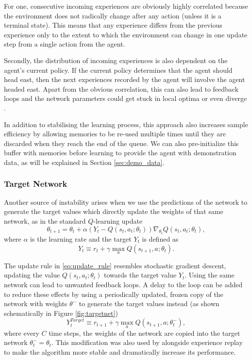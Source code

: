 For one, consecutive incoming experiences are obviously highly correlated because the environment does not radically change after any action (unless it is a terminal state). This means that any experience differs from the previous experience only to the extent to which the environment can change in one update step from a single action from the agent.

Secondly, the distribution of incoming experiences is also dependent on the agent's current policy. If the current policy determines that the agent should head east, then the next experiences recorded by the agent will involve the agent headed east. Apart from the obvious correlation, this can also lead to feedback loops and the network parameters could get stuck in local optima or even diverge \citep{tsitsiklis1997analysis,mnih2015human}.

In addition to stabilising the learning process, this approach also increases sample efficiency by allowing memories to be re-used multiple times until they are discarded when they reach the end of the queue. We can also pre-initialize this buffer with memories before learning to provide the agent with demonstration data, as will be explained in Section \ref{sec:demo_data}.


\subsubsection{Target Network}\label{sec:target_network}
Another source of instability arises when we use the predictions of the network to generate the target values which directly update the weights of that same network, as in the standard $Q$-learning update
\begin{equation}\label{eq:update_rule}
    \theta_{t+1} = \theta_t + \alpha(Y_t - Q(s_t, a_t; \theta_t))\nabla_{\theta_t}Q(s_t, a_t; \theta_t),
\end{equation}
where $\alpha$ is the learning rate and the target $Y_t$ is defined as
\begin{equation}\label{eq:target}
    Y_t \equiv r_t + \gamma \max_a Q(s_{t+1}, a; \theta_t).
\end{equation}

The update rule in \eqref{eq:update_rule} resembles stochastic gradient descent, updating the value $Q(s_t, a_t; \theta_t)$ towards the target value $Y_t$. Using the same network can lead to unwanted feedback loops. A delay to the loop can be added to reduce these effects by using a periodically updated, frozen copy of the network with weights $\theta^-$ to generate the target values instead (as shown schematically in Figure \ref{fig:targetnet})
\begin{equation}\label{eq:target_target}
    Y^{Target}_t \equiv r_{t+1} + \gamma \max_a Q(s_{t+1}, a; \theta_t^-),
\end{equation}
where every $C$ time steps, the weights of the network are copied into the target network $\theta_t^- = \theta_t$. This modification was also used by \cite{mnih2015human} alongside experience replay to make the algorithm more stable and dramatically increase its performance.

